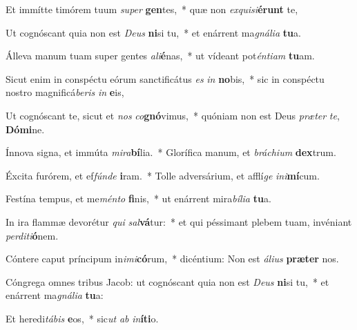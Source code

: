 \item Et immítte timórem tuum \textit{su}\textit{per} \textbf{gen}tes,~* quæ non \textit{ex}\textit{qui}\textit{si}\textbf{é}\textbf{runt} te,
\item Ut cognóscant quia non est \textit{De}\textit{us} \textbf{ni}si tu,~* et enárrent ma\textit{gná}\textit{li}\textit{a} \textbf{tu}a.
\item Álleva manum tuam super gentes \textit{a}\textit{li}\textbf{é}nas,~* ut vídeant pot\textit{én}\textit{ti}\textit{am} \textbf{tu}am.
\item Sicut enim in conspéctu eórum sanctificátus \textit{es} \textit{in} \textbf{no}bis,~* sic in conspéctu nostro magnificá\textit{be}\textit{ris} \textit{in} \textbf{e}is,
\item Ut cognóscant te, sicut et \textit{nos} \textit{co}\textbf{gnó}vimus,~* quóniam non est Deus \textit{præ}\textit{ter} \textit{te}, \textbf{Dó}\textbf{mi}ne.
\item Ínnova signa, et immúta \textit{mi}\textit{ra}\textbf{bí}lia.~* Glorífica manum, et \textit{brá}\textit{chi}\textit{um} \textbf{dex}trum.
\item Éxcita furórem, et ef\textit{fún}\textit{de} \textbf{i}ram.~* Tolle adversárium, et afflí\textit{ge} \textit{in}\textit{i}\textbf{mí}cum.
\item Festína tempus, et me\textit{mén}\textit{to} \textbf{fi}nis,~* ut enárrent mira\textit{bí}\textit{li}\textit{a} \textbf{tu}a.
\item In ira flammæ devorétur \textit{qui} \textit{sal}\textbf{vá}tur:~* et qui péssimant plebem tuam, invéniant \textit{per}\textit{di}\textit{ti}\textbf{ó}nem.
\item Cóntere caput príncipum in\textit{i}\textit{mi}\textbf{có}rum,~* dicéntium: Non est \textit{á}\textit{li}\textit{us} \textbf{præ}\textbf{ter} nos.
\item Cóngrega omnes tribus Jacob: ut cognóscant quia non est \textit{De}\textit{us} \textbf{ni}si tu,~* et enárrent ma\textit{gná}\textit{li}\textit{a} \textbf{tu}a:
\item Et heredi\textit{tá}\textit{bis} \textbf{e}os,~* sic\textit{ut} \textit{ab} \textit{in}\textbf{í}\textbf{ti}o.
